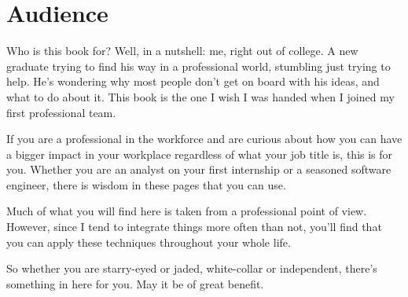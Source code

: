 \chapter{Audience}

Who is this book for? Well, in a nutshell: me, right out of college. A new graduate trying to find his way
in a professional world, stumbling just trying to help. He's wondering why most people don't get on 
board with his ideas, and what to do about it. This book is the one I wish I was handed when I joined my
first professional team.

If you are a professional in the workforce and are curious about how you can have a bigger impact
in your workplace regardless of what your job title is, this is for you. Whether you are an analyst
on your first internship or a seasoned software engineer, there is wisdom in these pages that you
can use.

Much of what you will find here is taken from a professional point of view. However, since I tend to
integrate things more often than not, you'll find that you can apply these techniques throughout your
whole life.

So whether you are starry-eyed or jaded, white-collar or independent, there's something in here
for you. May it be of great benefit.